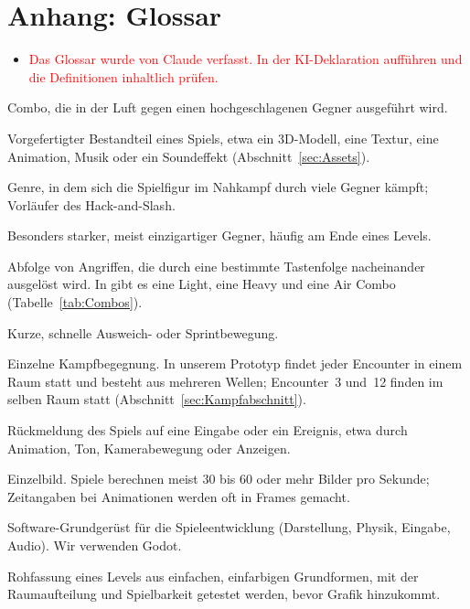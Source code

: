 \documentclass[../Main.tex]{subfiles}
\begin{document}
\newpage
\section{Anhang: Glossar} \label{sec:Glossar}

\begin{itemize}[leftmargin=1.5cm]
\item \textcolor{red}{Das Glossar wurde von Claude verfasst. In der KI-Deklaration aufführen und die Definitionen inhaltlich prüfen.}
\end{itemize}

\begin{description}[style=unboxed, leftmargin=0cm, itemsep=0.3em]
\item[Air Combo] Combo, die in der Luft gegen einen hochgeschlagenen Gegner ausgeführt wird.
\item[Asset] Vorgefertigter Bestandteil eines Spiels, etwa ein 3D-Modell, eine Textur, eine Animation, Musik oder ein Soundeffekt (Abschnitt~\ref{sec:Assets}).
\item[Beat 'em up] Genre, in dem sich die Spielfigur im Nahkampf durch viele Gegner kämpft; Vorläufer des Hack-and-Slash.
\item[Bossgegner] Besonders starker, meist einzigartiger Gegner, häufig am Ende eines Levels.
\item[Combo] Abfolge von Angriffen, die durch eine bestimmte Tastenfolge nacheinander ausgelöst wird. In  gibt es eine Light, eine Heavy und eine Air Combo (Tabelle~\ref{tab:Combos}).
\item[Dash] Kurze, schnelle Ausweich- oder Sprintbewegung.
\item[Encounter] Einzelne Kampfbegegnung. In unserem Prototyp findet jeder Encounter in einem Raum statt und besteht aus mehreren Wellen; Encounter~3 und~12 finden im selben Raum statt (Abschnitt~\ref{sec:Kampfabschnitt}).
\item[Feedback] Rückmeldung des Spiels auf eine Eingabe oder ein Ereignis, etwa durch Animation, Ton, Kamerabewegung oder Anzeigen.
\item[Frame] Einzelbild. Spiele berechnen meist 30 bis 60 oder mehr Bilder pro Sekunde; Zeitangaben bei Animationen werden oft in Frames gemacht.
\item[Game Engine] Software-Grundgerüst für die Spieleentwicklung (Darstellung, Physik, Eingabe, Audio). Wir verwenden Godot.
\item[Greybox] Rohfassung eines Levels aus einfachen, einfarbigen Grundformen, mit der Raumaufteilung und Spielbarkeit getestet werden, bevor Grafik hinzukommt.

\end{description}
\end{document}
